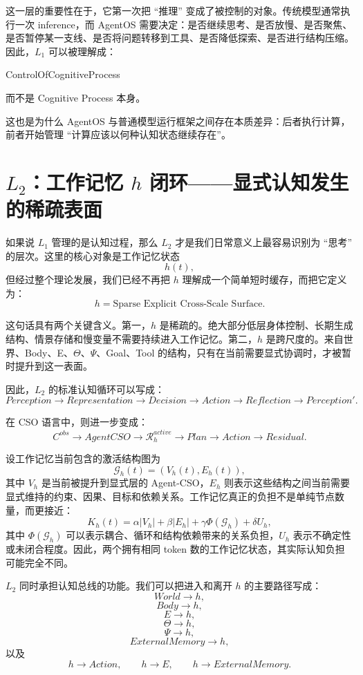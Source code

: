 这一层的重要性在于，它第一次把 ``推理'' 变成了被控制的对象。传统模型通常执行一次 inference，而 AgentOS 需要决定：是否继续思考、是否放慢、是否聚焦、是否暂停某一支线、是否将问题转移到工具、是否降低探索、是否进行结构压缩。因此，$L_1$ 可以被理解成：
\begin{statementbox}
ControlOfCognitiveProcess
\end{statementbox}
而不是 Cognitive Process 本身。

这也是为什么 AgentOS 与普通模型运行框架之间存在本质差异：后者执行计算，前者开始管理 ``计算应该以何种认知状态继续存在''。

\section{$L_2$：工作记忆 $h$ 闭环——显式认知发生的稀疏表面}

如果说 $L_1$ 管理的是认知过程，那么 $L_2$ 才是我们日常意义上最容易识别为 ``思考'' 的层次。这里的核心对象是工作记忆状态
\[
h(t),
\]
但经过整个理论发展，我们已经不再把 $h$ 理解成一个简单短时缓存，而把它定义为：
\[
\boxed{
h=\text{Sparse Explicit Cross-Scale Surface}.
}
\]

这句话具有两个关键含义。第一，$h$ 是稀疏的。绝大部分低层身体控制、长期生成结构、情景存储和慢变量不需要持续进入工作记忆。第二，$h$ 是跨尺度的。来自世界、Body、E、$\Theta$、$\Psi$、Goal、Tool 的结构，只有在当前需要显式协调时，才被暂时提升到这一表面。

因此，$L_2$ 的标准认知循环可以写成：
\[
Perception
\rightarrow
Representation
\rightarrow
Decision
\rightarrow
Action
\rightarrow
Reflection
\rightarrow
Perception'.
\]

在 CSO 语言中，则进一步变成：
\[
C^{obs}
\rightarrow
AgentCSO
\rightarrow
\mathcal{R}^{active}_h
\rightarrow
Plan
\rightarrow
Action
\rightarrow
Residual.
\]

设工作记忆当前包含的激活结构图为
\[
\mathcal{G}_h(t)
=
\left(
V_h(t),
E_h(t)
\right),
\]
其中 $V_h$ 是当前被提升到显式层的 Agent-CSO，$E_h$ 则表示这些结构之间当前需要显式维持的约束、因果、目标和依赖关系。工作记忆真正的负担不是单纯节点数量，而更接近：
\[
K_h(t)
=
\alpha |V_h|
+
\beta |E_h|
+
\gamma \Phi(\mathcal{G}_h)
+
\delta U_h,
\]
其中 $\Phi(\mathcal{G}_h)$ 可以表示耦合、循环和结构依赖带来的关系负担，$U_h$ 表示不确定性或未闭合程度。因此，两个拥有相同 token 数的工作记忆状态，其实际认知负担可能完全不同。

$L_2$ 同时承担认知总线的功能。我们可以把进入和离开 $h$ 的主要路径写成：
\[
World\rightarrow h,
\]
\[
Body\rightarrow h,
\]
\[
E\rightarrow h,
\]
\[
\Theta\rightarrow h,
\]
\[
\Psi\rightarrow h,
\]
\[
ExternalMemory\rightarrow h,
\]
以及
\[
h\rightarrow Action,
\qquad
h\rightarrow E,
\qquad
h\rightarrow ExternalMemory.
\]

